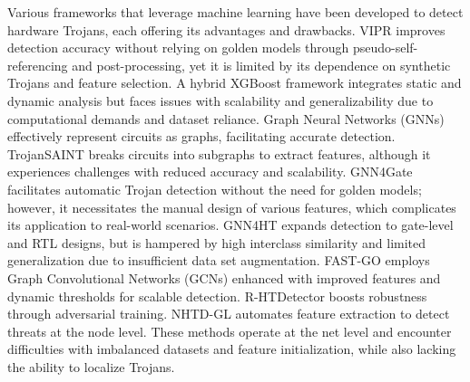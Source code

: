 

Various frameworks that leverage machine learning have been developed to detect hardware Trojans, each offering its advantages and drawbacks. VIPR \cite{gaikwad2023hardware} improves detection accuracy without relying on golden models through pseudo-self-referencing and post-processing, yet it is limited by its dependence on synthetic Trojans and feature selection. A hybrid XGBoost framework \cite{li2020xgboost} integrates static and dynamic analysis but faces issues with scalability and generalizability due to computational demands and dataset reliance. Graph Neural Networks (GNNs) effectively represent circuits as graphs, facilitating accurate detection. TrojanSAINT \cite{lashen2023trojansaint} breaks circuits into subgraphs to extract features, although it experiences challenges with reduced accuracy and scalability. GNN4Gate \cite{cheng2022gnn4gate} facilitates automatic Trojan detection without the need for golden models; however, it necessitates the manual design of various features, which complicates its application to real-world scenarios. GNN4HT \cite{chen2024gnn4ht} expands detection to gate-level and RTL designs, but is hampered by high interclass similarity and limited generalization due to insufficient data set augmentation. FAST-GO \cite{imangholi2024fast} employs Graph Convolutional Networks (GCNs) enhanced with improved features and dynamic thresholds for scalable detection. R-HTDetector \cite{hasegawa2022r} boosts robustness through adversarial training. NHTD-GL \cite{hasegawa2023node} automates feature extraction to detect threats at the node level. These methods operate at the net level and encounter difficulties with imbalanced datasets and feature initialization, while also lacking the ability to localize Trojans. 

